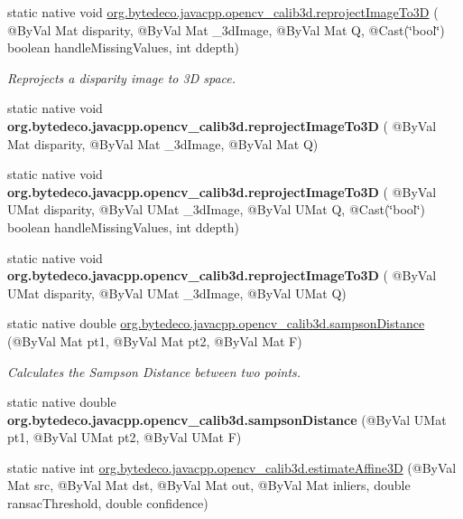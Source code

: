 \begin{DoxyCompactItemize}
\item 
static native void \hyperlink{group__calib3d_ga523a57d6b7e1229eed6a1c88b22d0408}{org.\+bytedeco.\+javacpp.\+opencv\+\_\+calib3d.\+reproject\+Image\+To3D} ( @By\+Val Mat disparity, @By\+Val Mat \+\_\+3d\+Image, @By\+Val Mat Q, @Cast(\char`\"{}bool\char`\"{}) boolean handle\+Missing\+Values, int ddepth)
\begin{DoxyCompactList}\small\item\em Reprojects a disparity image to 3D space. \end{DoxyCompactList}\item 
\mbox{\label{group__calib3d_ga7b4f0975d62a50b1eb490a6eb0b74058}} 
static native void {\bfseries org.\+bytedeco.\+javacpp.\+opencv\+\_\+calib3d.\+reproject\+Image\+To3D} ( @By\+Val Mat disparity, @By\+Val Mat \+\_\+3d\+Image, @By\+Val Mat Q)
\item 
\mbox{\label{group__calib3d_ga410bb3b577b61accf1c1382e84ac7c36}} 
static native void {\bfseries org.\+bytedeco.\+javacpp.\+opencv\+\_\+calib3d.\+reproject\+Image\+To3D} ( @By\+Val U\+Mat disparity, @By\+Val U\+Mat \+\_\+3d\+Image, @By\+Val U\+Mat Q, @Cast(\char`\"{}bool\char`\"{}) boolean handle\+Missing\+Values, int ddepth)
\item 
\mbox{\label{group__calib3d_gad2bbcd88c7441efc73cdf36586f62bfc}} 
static native void {\bfseries org.\+bytedeco.\+javacpp.\+opencv\+\_\+calib3d.\+reproject\+Image\+To3D} ( @By\+Val U\+Mat disparity, @By\+Val U\+Mat \+\_\+3d\+Image, @By\+Val U\+Mat Q)
\item 
static native double \hyperlink{group__calib3d_ga708b24ef9e230b1b82f146fb3e7b2377}{org.\+bytedeco.\+javacpp.\+opencv\+\_\+calib3d.\+sampson\+Distance} (@By\+Val Mat pt1, @By\+Val Mat pt2, @By\+Val Mat F)
\begin{DoxyCompactList}\small\item\em Calculates the Sampson Distance between two points. \end{DoxyCompactList}\item 
\mbox{\label{group__calib3d_ga82b4b5dc0269c56d3b5981642e8870bd}} 
static native double {\bfseries org.\+bytedeco.\+javacpp.\+opencv\+\_\+calib3d.\+sampson\+Distance} (@By\+Val U\+Mat pt1, @By\+Val U\+Mat pt2, @By\+Val U\+Mat F)
\item 
static native int \hyperlink{group__calib3d_ga07eb86fa8ee181d1695f57b6b93955cd}{org.\+bytedeco.\+javacpp.\+opencv\+\_\+calib3d.\+estimate\+Affine3D} (@By\+Val Mat src, @By\+Val Mat dst, @By\+Val Mat out, @By\+Val Mat inliers, double ransac\+Threshold, double confidence)

\end{DoxyCompactItemize}
